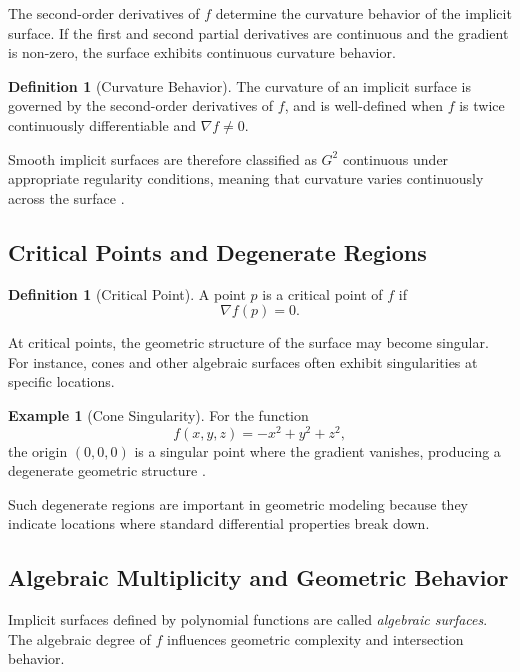 \documentclass[12pt, a4paper, oneside]{book}
\theoremstyle{plain}
\theoremstyle{definition}
\newtheorem{definition}[theorem]{Definition}
\newtheorem{example}[theorem]{Example}
\theoremstyle{remark}
\theoremstyle{definition}
\begin{document}
The second-order derivatives of $f$ determine the curvature behavior of the implicit surface. If the first and second partial derivatives are continuous and the gradient is non-zero, the surface exhibits continuous curvature behavior.

\begin{definition}[Curvature Behavior]
The curvature of an implicit surface is governed by the second-order derivatives of $f$, and is well-defined when $f$ is twice continuously differentiable and $\nabla f \neq 0$.
\end{definition}

Smooth implicit surfaces are therefore classified as $G^2$ continuous under appropriate regularity conditions, meaning that curvature varies continuously across the surface \cite{bloomenthal2000implicit}.

\subsection{Critical Points and Degenerate Regions}

\begin{definition}[Critical Point]
A point $p$ is a critical point of $f$ if
\[
\nabla f(p) = 0.
\]
\end{definition}

At critical points, the geometric structure of the surface may become singular. For instance, cones and other algebraic surfaces often exhibit singularities at specific locations.

\begin{example}[Cone Singularity]
For the function
\[
f(x,y,z) = -x^2 + y^2 + z^2,
\]
the origin $(0,0,0)$ is a singular point where the gradient vanishes, producing a degenerate geometric structure \cite{bloomenthal2000implicit}.
\end{example}

Such degenerate regions are important in geometric modeling because they indicate locations where standard differential properties break down.

\subsection{Algebraic Multiplicity and Geometric Behavior}

Implicit surfaces defined by polynomial functions are called \emph{algebraic surfaces}. The algebraic degree of $f$ influences geometric complexity and intersection behavior.
\end{document}
